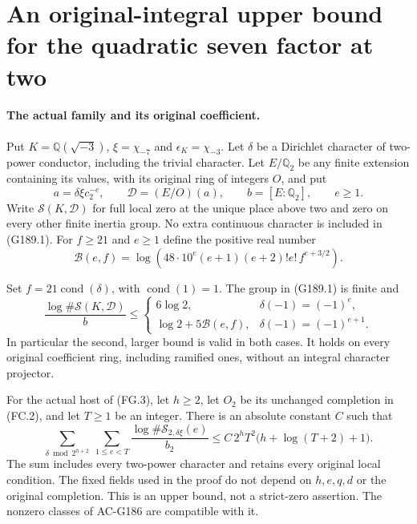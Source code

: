 \section{An original-integral upper bound for the quadratic seven factor at two}
\label{sec:quadratic-seven-coefficient-two-upper-bound}

\paragraph{The actual family and its original coefficient.}
Put $K=\mathbb Q(\sqrt{-3})$, $\xi=\chi_{-7}$ and
$\epsilon_K=\chi_{-3}$.  Let $\delta$ be a Dirichlet character
of two-power conductor, including the trivial character.
Let $E/\mathbb Q_2$ be any finite extension containing its values,
with its original ring of integers $O$, and put
\[
 a=\delta\xi c_2^{-e},\qquad
 \mathscr D=(E/O)(a),\qquad b=[E:\mathbb Q_2],\qquad e\geq1.
 \tag{G189.1}
\]
Write $\mathcal S(K,\mathscr D)$ for full local zero at the unique
place above two and zero on every other finite inertia group.
No extra continuous character is included in (G189.1).
For $f\geq21$ and $e\geq1$ define the positive real number
\[
 \mathcal B(e,f)=
 \log\!\left(48\cdot10^e(e+1)(e+2)!e!\,
                              f^{e+3/2}\right).
 \tag{G189.2}
\]

\begin{theorem}
\label{AC-G189}
Set $f=21\operatorname{cond}(\delta)$, with
$\operatorname{cond}(1)=1$.  The group in (G189.1) is finite and
\[
 \frac{\log\#\mathcal S(K,\mathscr D)}b
 \leq
 \begin{cases}
 6\log2,&\delta(-1)=(-1)^e,\\
 \log2+5\mathcal B(e,f),&\delta(-1)=(-1)^{e+1}.
 \end{cases}
 \tag{G189.3}
\]
In particular the second, larger bound is valid in both cases.
It holds on every original coefficient ring, including ramified
ones, without an integral character projector.

For the actual host of (FG.3), let $h\geq2$, let $O_2$ be its
unchanged completion in (FC.2), and let $T\geq1$ be an integer.
There is an absolute constant $C$ such that
\[
 \sum_{\delta\bmod2^{h+2}}\ \sum_{1\leq e<T}
 \frac{\log\#\mathcal S_{2,\delta\xi}(e)}{b_2}
 \leq C\,2^hT^2\bigl(h+\log(T+2)+1\bigr).
 \tag{G189.4}
\]
The sum includes every two-power character and retains every
original local condition.  The fixed fields used in the proof
do not depend on $h,e,q,d$ or the original completion.
This is an upper bound, not a strict-zero assertion.
The nonzero classes of AC-G186 are compatible with it.
\end{theorem}

